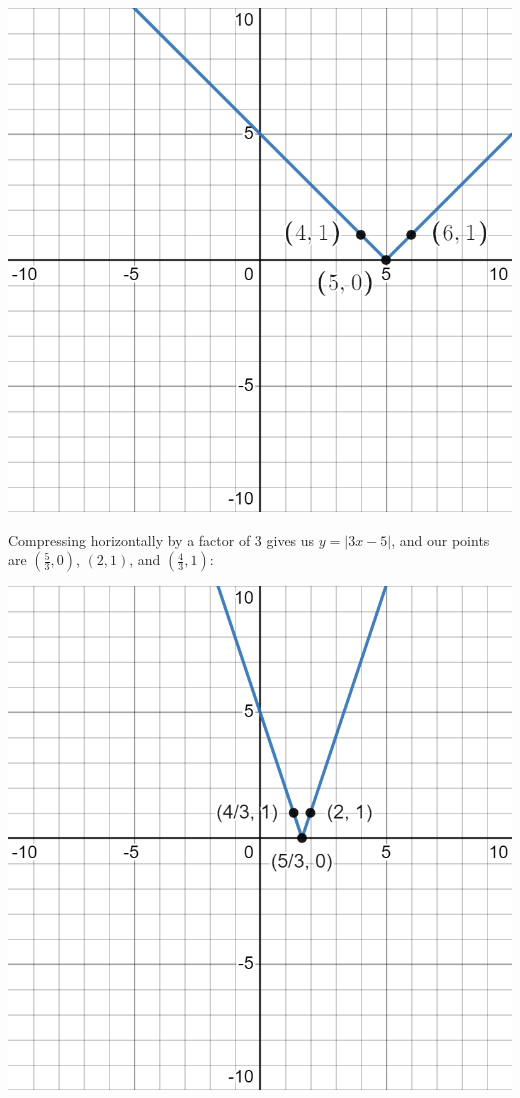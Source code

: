 \documentclass[handout, noauthor, nooutcomes]{ximera}
\begin{document}
\begin{example}
\begin{explanation}
\includegraphics[width=1\linewidth]{images/exgraph2.png}

Compressing horizontally by a factor of 3 gives us $y = |3x - 5|$, and our points are $\left(\frac{5}{3}, 0\right)$, $(2, 1)$, and $\left(\frac{4}{3}, 1\right)$:

\includegraphics[width=1\linewidth]{images/exgraph3.png}


\end{explanation}
\end{example}
\end{document}
